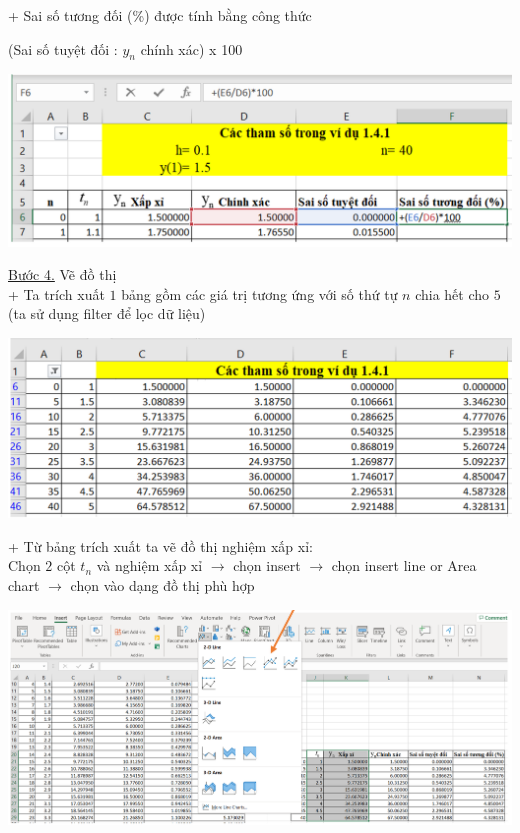 	+ Sai số tương đối (\%) được tính bằng công thức
\begin{center}
	(Sai số tuyệt đối : ${{y}_{n}}$ chính xác) x 100
\end{center}
\begin{center}
	\includegraphics[scale=0.7]{Images/cac_tham_so_trong_vidu_1_4_1t5}
\end{center}
\underline{Bước 4.} Vẽ đồ thị\\
+ Ta trích xuất $1$ bảng gồm các giá trị tương ứng với số thứ tự $n$ chia hết cho $5$ (ta sử dụng filter để lọc dữ liệu) 
\begin{center}
	\includegraphics[scale=0.7]{Images/cac_tham_so_trong_vidu_1_4_1t6}
\end{center}
+ Từ bảng trích xuất ta vẽ đồ thị nghiệm xấp xỉ: \\
Chọn $2$ cột ${{t}_{n}}$ và nghiệm xấp xỉ $\rightarrow$  chọn insert $\rightarrow$ chọn insert line or Area chart \newline$\rightarrow$ chọn vào dạng đồ thị phù hợp
\begin{center}
	\includegraphics[scale=0.57]{Images/cac_tham_so_trong_vidu_1_4_1t7}
\end{center}
